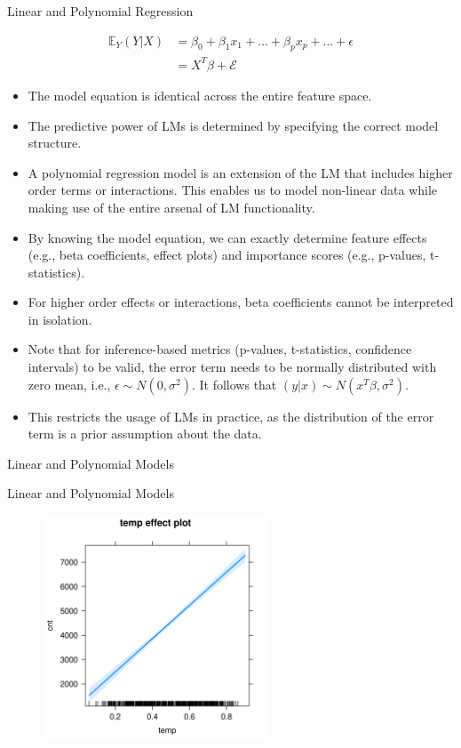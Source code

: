 \documentclass[11pt,compress,t,notes=noshow, aspectratio=169, xcolor=table]{beamer}
\begin{document}
\begin{vbframe}{Linear and Polynomial Regression}

\begin{align*}
\mathbb{E}_Y(Y \vert X) &= \beta_0 + \beta_1 x_1 + \dots + \beta_p x_p + \dots + \epsilon \\
 &= X^T\beta + \mathcal{E}
\end{align*}

\begin{itemize}
\itemsep2em
\item The model equation is identical across the entire feature space.
\item The predictive power of LMs is determined by specifying the correct model structure.
\item
A polynomial regression model is an extension of the LM that includes higher order terms or interactions. This enables us to model non-linear data while making use of the entire arsenal of LM functionality.
\item
By knowing the model equation, we can exactly determine feature effects (e.g., beta coefficients, effect plots) and importance scores (e.g., p-values, t-statistics).
\item For higher order effects or interactions, beta coefficients cannot be interpreted in isolation.
\item Note that for inference-based metrics (p-values, t-statistics, confidence intervals) to be valid, the error term needs to be normally distributed with zero mean, i.e., $\epsilon \sim N(0, \sigma^2)$. It follows that $(y \vert x) \sim N(x^T \beta, \sigma^2)$.
\item This restricts the usage of LMs in practice, as the distribution of the error term is a prior assumption about the data.
\end{itemize}
\end{vbframe}

\begin{vbframe}{Linear and Polynomial Models}
\tiny

\end{vbframe}

\begin{vbframe}{Linear and Polynomial Models}
\begin{figure}
  \includegraphics[width = 0.6\textwidth]{figure/lm_effect_plot.png}
\end{figure}
\end{vbframe}
\end{document}
